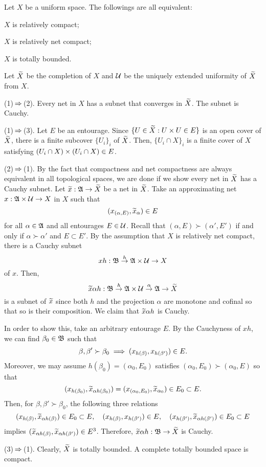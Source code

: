 \documentclass{../exp}
\begin{document}
\begin{thm}
Let $X$ be a uniform space.
The followings are all equivalent:
\begin{cond}
\item $X$ is relatively compact;
\item $X$ is relatively net compact;
\item $X$ is totally bounded.
\end{cond}
\end{thm}
\begin{pf}
Let $\widetilde X$ be the completion of $X$ and $\mathcal{U}$ be the uniquely extended uniformity of $\widetilde X$ from $X$.

(1)$\impl$(2).
Every net in $X$ has a subnet that converges in $\widetilde X$.
The subnet is Cauchy.

(1)$\impl$(3).
Let $E$ be an entourage.
Since $\{U\in\widetilde X:U\times U\in E\}$ is an open cover of $\widetilde X$, there is a finite subcover $\{U_i\}_i$ of $\widetilde X$.
Then, $\{U_i\cap X\}_i$ is a finite cover of $X$ satisfying $(U_i\cap X)\times(U_i\cap X)\in E$.

(2)$\impl$(1).
By the fact that compactness and net compactness are always equivalent in all topological spaces, we are done if we show every net in $\widetilde X$ has a Cauchy subnet.
Let $\tld x:\fA\to\tld X$ be a net in $\widetilde X$.
Take an approximating net $x:\fA\x\cU\to X$ in $X$ such that
\[(x_{(\alpha,E)},\widetilde x_\alpha)\in E\]
for all $\alpha\in\mathfrak{A}$ and all entourages $E\in\mathcal{U}$.
Recall that $(\alpha,E)\succ(\alpha',E')$ if and only if $\alpha\succ\alpha'$ and $E\subset E'$.
By the assumption that $X$ is relatively net compact, there is a Cauchy subnet
\[xh:\fB\to{h}\fA\x\cU\to X\]
of $x$.
Then,
\[\tld x\alpha h:\fB\to{h}\fA\x\cU\to{\alpha}\fA\to\tld X\]
is a subnet of $\widetilde x$ since both $h$ and the projection $\alpha$ are monotone and cofinal so that so is their composition.
We claim that $\widetilde x\alpha h$ is Cauchy.

In order to show this, take an arbitrary entourage $E$.
By the Cauchyness of $xh$, we can find $\beta_0\in\mathfrak{B}$ such that
\[\beta,\beta'\succ\beta_0\impl(x_{h(\beta)},x_{h(\beta')})\in E.\]
Moreover, we may assume $h(\beta_0)=(\alpha_0,E_0)$ satisfies $(\alpha_0,E_0)\succ(\alpha_0,E)$ so that
\[(x_{h(\beta_0)},\widetilde x_{\alpha h(\beta_0)})=(x_{(\alpha_0,E_0)},\widetilde x_{\alpha_0})\in E_0\subset E.\]
Then, for $\beta,\beta'\succ\beta_0$, the following three relations
\[(x_{h(\beta)},\widetilde x_{\alpha h(\beta)})\in E_0\subset E,\quad(x_{h(\beta)},x_{h(\beta')})\in E,\quad(x_{h(\beta')},\widetilde x_{\alpha h(\beta')})\in E_0\subset E\]
implies $(\widetilde x_{\alpha h(\beta)},\widetilde x_{\alpha h(\beta')})\in E^3$.
Therefore, $\tld x\alpha h:\fB\to\tld X$ is Cauchy.

(3)$\impl$(1).
Clearly, $\widetilde X$ is totally bounded.
A complete totally bounded space is compact.
\end{pf}
\end{document}
